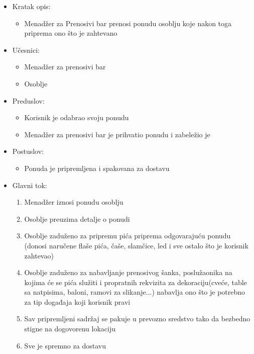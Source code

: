 \documentclass[a4paper]{article}
\begin{document}
\begin{itemize}
    \item Kratak opis:
        \begin{itemize}
            \item Menadžer za Prenosivi bar prenosi ponudu osoblju koje nakon toga priprema ono što je zahtevano
        \end{itemize}
    \item Učesnici:
        \begin{itemize}
            \item Menadžer za prenosivi bar
            \item Osoblje
        \end{itemize}
    \item Preduslov:
        \begin{itemize}
            \item Korisnik je odabrao svoju ponudu
		    \item Menadžer za prenosivi bar je prihvatio ponudu i zabeležio je	
        \end{itemize}
    \item Postuslov:
        \begin{itemize}
            \item Ponuda je pripremljena i spakovana za dostavu
        \end{itemize}
    \item Glavni tok:
        \begin{enumerate}
           \item Menadžer iznosi ponudu osoblju
		   \item Osoblje preuzima detalje o ponudi
	       \item Osoblje zaduženo za pripremu pića priprema odgovarajuću ponudu (donosi naručene flaše pića, čaše, slamčice, led i sve ostalo što je korisnik zahtevao)
	       \item Osoblje  zaduženo za nabavljanje prenosivog šanka, poslužaonika na kojima će se pića služiti i propratnih rekvizita za dekoraciju(cveće, table sa natpisima, baloni, ramovi za slikanje...) nabavlja ono što je potrebno za tip događaja koji korisnik pravi
	         \item Sav pripremljeni sadržaj se pakuje u prevozno sredstvo tako da bezbedno stigne na dogovorenu lokaciju
	        \item Sve je spremno za dostavu
        \end{enumerate}
\end{itemize}
\end{document}
